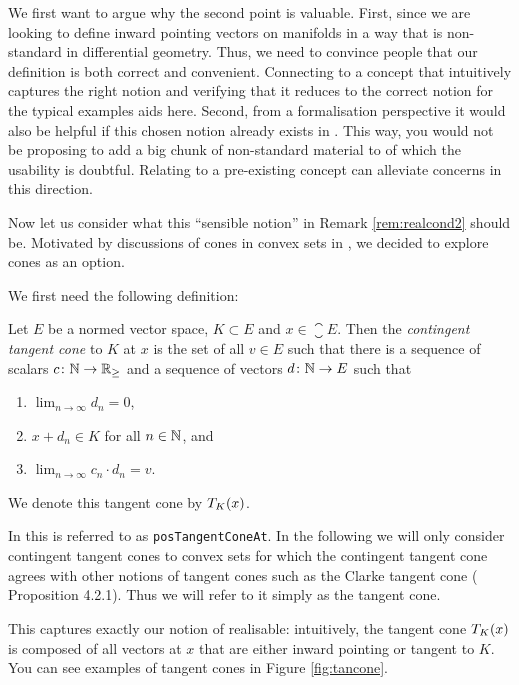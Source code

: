 We first want to argue why the second point is valuable. 
First, since we are looking to define inward pointing vectors on manifolds in a way that is non-standard in differential geometry. 
Thus, we need to convince people that our definition is both correct and convenient.
Connecting to a concept that intuitively captures the right notion and verifying that it reduces to the correct notion for the typical examples aids here. 
Second, from a formalisation perspective it would also be helpful if this chosen notion already exists in \mathlib. 
This way, you would not be proposing to add a big chunk of non-standard material to \mathlib of which the usability is doubtful. 
Relating to a pre-existing concept can alleviate concerns in this direction. 

Now let us consider what this ``sensible notion'' in Remark \ref{rem:realcond2} should be. 
Motivated by discussions of cones in convex sets in \cite{Rockafellar1998}, we decided to explore cones as an option. 

We first need the following definition:

\begin{defi}
    Let $E$ be a normed vector space, $K \subset E$ and $x \in \closure{E}$. 
    Then the \emph{contingent tangent cone} to $K$ at $x$ is the set of all $v \in E$ such that there is a sequence of scalars $c \colon \mathbb{N} \to \mathbb{R}_\ge$ and a sequence of vectors $d \colon \mathbb{N} \to E$ such that 
    \begin{enumerate}
        \item $\lim_{n \to \infty} d_n = 0$, 
        \item $x + d_n \in K$ for all $n \in \mathbb{N}$, and 
        \item $\lim_{n \to \infty} c_n \cdot d_n = v$.
    \end{enumerate}
    We denote this tangent cone by $T_{K}(x)$. 
\end{defi}

In \mathlib this is referred to as \lstinline|posTangentConeAt|.
In the following we will only consider contingent tangent cones to convex sets for which the contingent tangent cone agrees with other notions of tangent cones such as the Clarke tangent cone (\cite{Aubin1990} Proposition 4.2.1). 
Thus we will refer to it simply as the tangent cone. 

This captures exactly our notion of realisable: intuitively, the tangent cone $T_{K}(x)$ is composed of all vectors at $x$ that are either inward pointing or tangent to $K$. 
You can see examples of tangent cones in Figure \ref{fig:tancone}.

